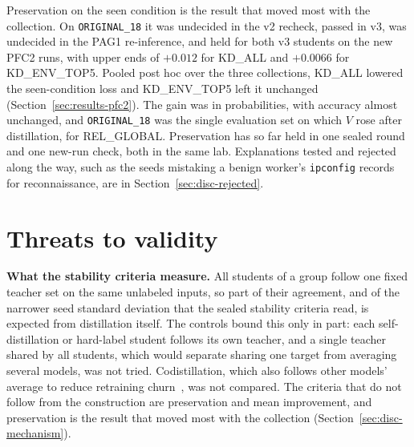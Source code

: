 Preservation on the seen condition is the result that moved most with
the collection. On \texttt{ORIGINAL\_18} it was undecided in the v2
recheck, passed in v3, was undecided in the PAG1 re-inference, and held
for both v3 students on the new PFC2 runs, with upper ends of $+0.012$
for KD\_ALL and $+0.0066$ for KD\_ENV\_TOP5. Pooled post hoc over the
three collections, KD\_ALL lowered the seen-condition loss and
KD\_ENV\_TOP5 left it unchanged (Section~\ref{sec:results-pfc2}). The
gain was in probabilities, with accuracy almost unchanged, and
\texttt{ORIGINAL\_18} was the single evaluation set on which $V$ rose
after distillation, for REL\_GLOBAL. Preservation has so far held in
one sealed round and one new-run check, both in the same lab.
Explanations tested and rejected along the way, such as the seeds
mistaking a benign worker's \texttt{ipconfig} records for
reconnaissance, are in Section~\ref{sec:disc-rejected}.

\section{Threats to validity}
\label{sec:disc-threats}

\textbf{What the stability criteria measure.}
All students of a group follow one fixed teacher set on the same
unlabeled inputs, so part of their agreement, and of the narrower seed
standard deviation that the sealed stability criteria read, is expected
from distillation itself. The controls bound this only in part: each
self-distillation or hard-label student follows its own teacher, and a
single teacher shared by all students, which would separate sharing one
target from averaging several models, was not tried. Codistillation,
which also follows other models' average to reduce retraining
churn~\cite{anil2018large}, was not compared. The criteria that do not
follow from the construction are preservation and mean improvement,
and preservation is the result that moved most with the collection
(Section~\ref{sec:disc-mechanism}).

